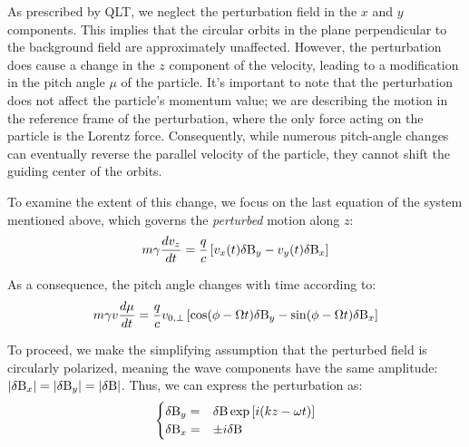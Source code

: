 As prescribed by QLT, we neglect the perturbation field in the $x$ and $y$ components. This implies that the circular orbits in the plane perpendicular to the background field are approximately unaffected. However, the perturbation does cause a change in the $z$ component of the velocity, leading to a modification in the pitch angle $\mu$ of the particle. It's important to note that the perturbation does not affect the particle's momentum value; we are describing the motion in the reference frame of the perturbation, where the only force acting on the particle is the Lorentz force. Consequently, while numerous pitch-angle changes can eventually reverse the parallel velocity of the particle, they cannot shift the guiding center of the orbits.

To examine the extent of this change, we focus on the last equation of the system mentioned above, which governs the \emph{perturbed} motion along $z$:
%
\begin{equation}
m \gamma \frac{dv_z}{dt} = \frac{q}{c} \left[v_x(t) \delta {\rm B}_y - v_y(t) \delta {\rm B}_x \right]
\end{equation}

As a consequence, the pitch angle changes with time according to:
%
\begin{equation}
m\gamma v \frac{d\mu}{dt} = \frac{q}{c}v_{0,\perp} \left[\cos(\phi-\Omega t) \delta {\rm B}_y - \sin(\phi - \Omega t) \delta {\rm B}_x\right]
\label{eq:pitchanglemotion}
\end{equation}

To proceed, we make the simplifying assumption that the perturbed field is circularly polarized, meaning the wave components have the same amplitude: $|\delta {\rm B}_{x}| = |\delta {\rm B}_{y}| = |\delta {\rm B}|$. Thus, we can express the perturbation as:
%
\begin{equation}
\begin{cases}
\delta {\rm B}_y = &  \delta {\rm B} \exp \left[ i (kz - \omega t) \right] \\ %
\delta {\rm B}_x = & \pm i \delta {\rm B}
\end{cases}
\end{equation}


